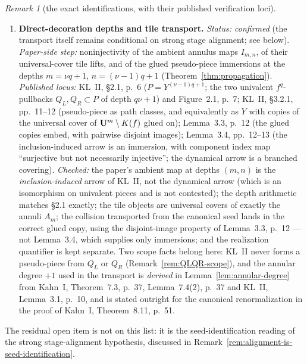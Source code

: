 \documentclass[11pt,reqno]{amsart}
\theoremstyle{definition}
\theoremstyle{remark}
\newtheorem{remark}[theorem]{Remark}
\begin{document}
\begin{remark}[the exact identifications, with their published verification loci]
\begin{enumerate}
shows, the set-theoretic equalizer need not be the pullback in the
category of complex \(1\)-manifolds) is regenerated at each stage by
Proposition~\ref{prop:base-change}(6) and independently by Kahn~I,
Lemma~7.7, p.~40 and Lemma~7.9, p.~40.
\item \textbf{Direct-decoration depths and tile transport.}
\emph{Status: confirmed} (the transport itself remains conditional on
strong stage alignment; see below).
\emph{Paper-side step:} noninjectivity of the ambient annulus maps
\(I_{m,n}\), of their universal-cover tile lifts, and of the glued
pseudo-piece immersions at the depths \(m=\nu q+1\),
\(n=(\nu-1)q+1\) (Theorem~\ref{thm:propagation}).
\emph{Published locus:} KL~II, \S2.1, p.~6 (\(P=Y^{(\nu-1)q+1}\); the
two univalent \(f^q\)-pullbacks \(Q_L,Q_R\subset P\) of depth
\(q\nu+1\)) and Figure~2.1, p.~7; KL~II, \S3.2.1, pp.~11--12
(pseudo-piece as path classes, and equivalently as \(Y\) with copies
of the universal cover of \(\mathbf{U}^m\setminus K(f)\) glued on);
Lemma~3.3, p.~12 (the glued copies embed, with pairwise disjoint
images); Lemma~3.4, pp.~12--13 (the inclusion-induced arrow is an
immersion, with component index map ``surjective but not necessarily
injective''; the dynamical arrow is a branched covering).
\emph{Checked:} the paper's ambient map at depths \((m,n)\) is the
\emph{inclusion-induced} arrow of KL~II, not the dynamical arrow (which
is an isomorphism on univalent pieces and is not contested); the depth
arithmetic matches \S2.1 exactly; the tile objects are universal covers
of exactly the annuli \(A_m\); the collision transported from the
canonical seed lands in the correct glued copy, using the
disjoint-image property of Lemma~3.3, p.~12 --- not Lemma~3.4, which
supplies only immersions; and the realization quantifier is kept
separate.  Two scope facts belong here: KL~II never forms a
pseudo-piece from \(Q_L\) or \(Q_R\)
(Remark~\ref{rem:QLQR-scope}), and the annular degree \(+1\) used in
the transport is \emph{derived} in Lemma~\ref{lem:annular-degree} from
Kahn~I, Theorem~7.3, p.~37, Lemma~7.4(2), p.~37 and KL~II, Lemma~3.1,
p.~10, and is stated outright for the canonical renormalization in the
proof of Kahn~I, Theorem~8.11, p.~51.
\end{enumerate}
The residual open item is not on this list: it is the
seed-identification reading of the strong stage-alignment hypothesis,
discussed in Remark~\ref{rem:alignment-is-seed-identification}.
\end{remark}
\end{document}
